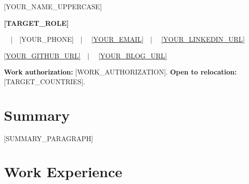 \documentclass[10pt,letterpaper]{article}
\newcommand{\sep}{~~|~~}
\begin{document}
\begin{center}
  {\fontsize{26}{30}\selectfont\color{cvblue} [YOUR_NAME_UPPERCASE]}\par
  \vspace{2pt}
  {\fontsize{11}{13}\selectfont\bfseries [TARGET_ROLE]}\par
  \vspace{4pt}
  {\fontsize{8.5}{11}\sep [YOUR_PHONE]\sep
  \href{mailto:[YOUR_EMAIL]}{\underline{[YOUR_EMAIL]}}\sep
  \href{[YOUR_LINKEDIN_URL]}{\underline{[YOUR_LINKEDIN_URL]}}\par
  \href{[YOUR_GITHUB_URL]}{\underline{[YOUR_GITHUB_URL]}}\sep
  \href{[YOUR_BLOG_URL]}{\underline{[YOUR_BLOG_URL]}}\par
  \vspace{3pt}
  {\fontsize{9}{11}\selectfont\textbf{Work authorization:} [WORK_AUTHORIZATION]. \textbf{Open to relocation:} [TARGET_COUNTRIES].\par}}
\end{center}
\vspace{-6pt}

\section*{Summary}
[SUMMARY_PARAGRAPH]


\section*{Work Experience}
\end{document}

